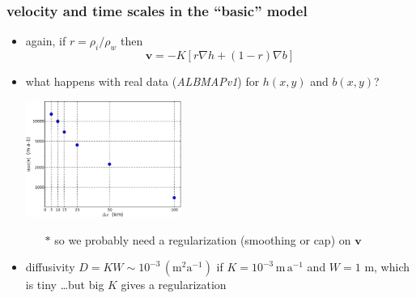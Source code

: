 \documentclass[hide notes,intlimits]{beamer}
\begin{document}
\begin{frame}
  \frametitle{velocity and time scales in the ``basic'' model}

  \begin{itemize}
    \item again, if $r = \rho_i/\rho_w$ then
      $$\mathbf{v} = - K \left[r \nabla h + (1-r) \nabla b\right]$$
    \item what happens with real data (\emph{ALBMAPv1}) for $h(x,y)$ and $b(x,y)$?
    \begin{center}
    \medskip
     \qquad \includegraphics[width=0.4\textwidth]{figs/vresults}
    \medskip
    \end{center}
       \small
       \begin{itemize}
       \item[$\ast$] so we probably need a regularization (smoothing or cap) on $\mathbf{v}$
       \end{itemize}
       \normalsize
    \item diffusivity $D = K W \sim 10^{-3} \, (\text{m}^2 \text{a}^{-1})$ if $K=10^{-3} \,\text{m}\,\text{a}^{-1}$ and $W=1$ m, which is tiny \small \dots but big $K$ gives a regularization
  \end{itemize}

\end{frame}
\end{document}
